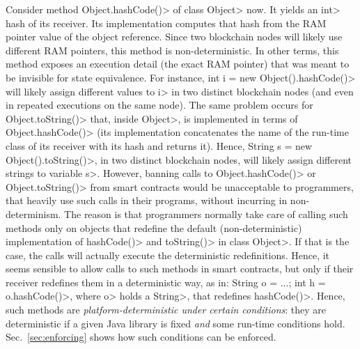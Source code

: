 Consider method \<Object.hashCode()> of class \<Object> now. It yields an \<int>
hash of its receiver. Its implementation computes that hash from the
RAM pointer value of the object reference.
Since two blockchain nodes will likely use different RAM pointers,
this method is non-deterministic.
In other terms, this method exposes an execution detail (the exact RAM pointer)
that was meant to be invisible for state equivalence.
For instance,
\<int i = new Object().hashCode()>
will likely assign different values to \<i>
in two distinct blockchain nodes
(and even in repeated executions on the same node).
The same problem occurs for \<Object.toString()> that, inside
\<Object>, is implemented in terms of \<Object.hashCode()> (its
implementation concatenates
the name of the run-time class of its receiver with its hash and returns it).
Hence, \<String s = new Object().toString()>,
in two distinct blockchain nodes,
will likely assign different strings to variable \<s>.
However, banning calls to \<Object.hashCode()> or \<Object.toString()>
from smart contracts would be unacceptable to programmers, that
heavily use such calls in their programs, without incurring in
non-determinism. The reason is that programmers normally
take care of calling such methods only on objects that redefine
the default (non-deterministic) implementation of
\<hashCode()> and \<toString()> in class \<Object>.
If that is the case, the calls will actually
execute the deterministic redefinitions. Hence, it seems sensible
to allow calls to such methods in smart contracts, but only if their receiver
redefines them in a deterministic way, as in:
\<String o = ...; int h = o.hashCode()>,
where \<o> holds a \<String>, that redefines \<hashCode()>.
%
%
%
Hence, such methods are \emph{platform-deterministic under certain conditions}:
they are deterministic if a given Java library is fixed \emph{and} some run-time conditions hold.
Sec.~\ref{sec:enforcing} shows how such conditions can be enforced.

